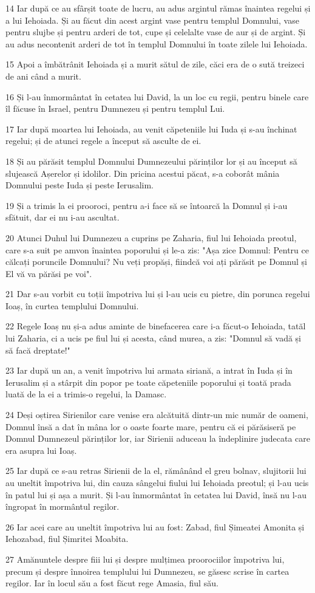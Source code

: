 \par 14 Iar după ce au sfârșit toate de lucru, au adus argintul rămas înaintea regelui și a lui Iehoiada. Și au făcut din acest argint vase pentru templul Domnului, vase pentru slujbe și pentru arderi de tot, cupe și celelalte vase de aur și de argint. Și au adus necontenit arderi de tot în templul Domnului în toate zilele lui Iehoiada.
\par 15 Apoi a îmbătrânit Iehoiada și a murit sătul de zile, căci era de o sută treizeci de ani când a murit.
\par 16 Și l-au înmormântat în cetatea lui David, la un loc cu regii, pentru binele care îl făcuse în Israel, pentru Dumnezeu și pentru templul Lui.
\par 17 Iar după moartea lui Iehoiada, au venit căpeteniile lui Iuda și s-au închinat regelui; și de atunci regele a început să asculte de ei.
\par 18 Și au părăsit templul Domnului Dumnezeului părinților lor și au început să slujească Așerelor și idolilor. Din pricina acestui păcat, s-a coborât mânia Domnului peste Iuda și peste Ierusalim.
\par 19 Și a trimis la ei prooroci, pentru a-i face să se întoarcă la Domnul și i-au sfătuit, dar ei nu i-au ascultat.
\par 20 Atunci Duhul lui Dumnezeu a cuprins pe Zaharia, fiul lui Iehoiada preotul, care s-a suit pe amvon înaintea poporului și le-a zis: "Așa zice Domnul: Pentru ce călcați poruncile Domnului? Nu veți propăși, fiindcă voi ați părăsit pe Domnul și El vă va părăsi pe voi".
\par 21 Dar s-au vorbit cu toții împotriva lui și l-au ucis cu pietre, din porunca regelui Ioaș, în curtea templului Domnului.
\par 22 Regele Ioaș nu și-a adus aminte de binefacerea care i-a făcut-o Iehoiada, tatăl lui Zaharia, ci a ucis pe fiul lui și acesta, când murea, a zis: "Domnul să vadă și să facă dreptate!"
\par 23 Iar după un an, a venit împotriva lui armata siriană, a intrat în Iuda și în Ierusalim și a stârpit din popor pe toate căpeteniile poporului și toată prada luată de la ei a trimis-o regelui, la Damasc.
\par 24 Deși oștirea Sirienilor care venise era alcătuită dintr-un mic număr de oameni, Domnul însă a dat în mâna lor o oaste foarte mare, pentru că ei părăsiseră pe Domnul Dumnezeul părinților lor, iar Sirienii aduceau la îndeplinire judecata care era asupra lui Ioaș.
\par 25 Iar după ce s-au retras Sirienii de la el, rămânând el greu bolnav, slujitorii lui au uneltit împotriva lui, din cauza sângelui fiului lui Iehoiada preotul; și l-au ucis în patul lui și așa a murit. Și l-au înmormântat în cetatea lui David, însă nu l-au îngropat în mormântul regilor.
\par 26 Iar acei care au uneltit împotriva lui au fost: Zabad, fiul Șimeatei Amonita și Iehozabad, fiul Șimritei Moabita.
\par 27 Amănuntele despre fiii lui și despre mulțimea proorociilor împotriva lui, precum și despre înnoirea templului lui Dumnezeu, se găsesc scrise în cartea regilor. Iar în locul său a fost făcut rege Amasia, fiul său.

